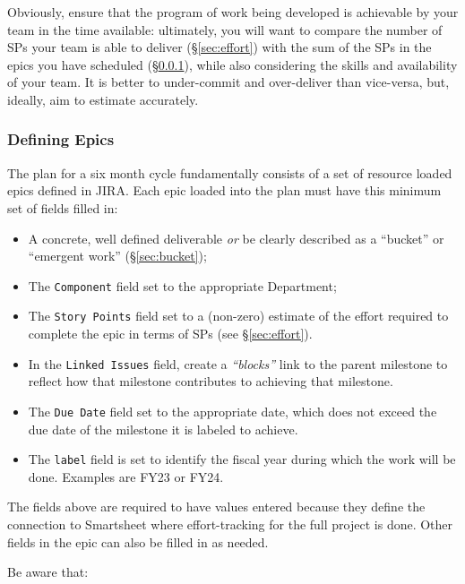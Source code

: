 Obviously, ensure that the program of work being developed is achievable by your team in the time available: ultimately, you will want to compare the number of \glspl{SP} your team is able to deliver (\S\ref{sec:effort}) with the sum of the \glspl{SP} in the \glspl{epic} you have scheduled (\S\ref{sec:planning-epics}), while also considering the skills and availability of your team.
It is better to under-commit and over-deliver than vice-versa, but, ideally, aim to estimate accurately.

\subsubsection{Defining Epics} \label{sec:planning-epics}

The plan for a six month \gls{cycle} fundamentally consists of a set of resource loaded \glspl{epic} defined in \gls{JIRA}.
Each \gls{epic} loaded into the plan must have this minimum set of fields filled in:

\begin{itemize}
\item A concrete, well defined deliverable \emph{or} be clearly described as a ``bucket'' or ``emergent work'' (\S\ref{sec:bucket});
\item The \texttt{Component} field set to the appropriate Department;
\item The \texttt{Story Points} field set to a (non-zero) estimate of the effort required to complete the \gls{epic} in terms of \glspl{SP} (see \S\ref{sec:effort}).
\item In the \texttt{Linked Issues} field, create a \textit{``blocks''} link to the parent milestone to reflect how that milestone contributes to achieving that milestone.
\item The \texttt{Due Date} field set to the appropriate date, which does not exceed the due date of the milestone it is labeled to achieve.
\item The \texttt{label} field is set to identify the fiscal year during which the work will be done. Examples are \gls{FY23} or \gls{FY24}.

\end{itemize}
The fields above are required to have values entered because they define the connection to Smartsheet where effort-tracking for the full project is done. Other fields in the \gls{epic} can also be filled in as needed.

Be aware that:

